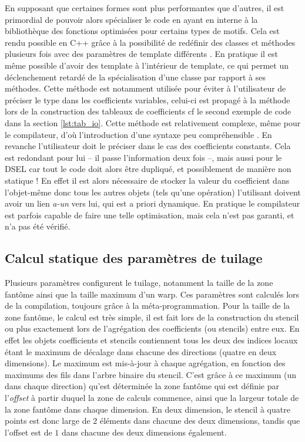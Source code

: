 En supposant que certaines formes sont plus performantes que d'autres, il est primordial de pouvoir alors spécialiser le code en ayant en interne à la bibliothèque des fonctions optimisées pour certains types de motifs. Cela est rendu possible en \textsf{C++} grâce à la possibilité de redéfinir des classes et méthodes plusieurs fois avec des paramètres de template différents \cite{Web1}. En pratique il est même possible d'avoir des template à l'intérieur de template, ce qui permet un déclenchement retardé de la spécialisation d'une classe par rapport à ses méthodes. Cette méthode est notamment utilisée pour éviter à l'utilisateur de préciser le type dans les coefficients variables, celui-ci est propagé à la méthode lors de la construction des tableaux de coefficients cf le second exemple de code dans la section \ref{lst:tab_io}. Cette méthode est relativement complexe, même pour le compilateur, d'où l'introduction d'une syntaxe peu compréhensible \cite{Web2}. En revanche l'utilisateur doit le préciser dans le cas des coefficients constants. Cela est redondant pour lui -- il passe l'information deux fois --, mais aussi pour le DSEL car tout le code doit alors être dupliqué, et possiblement de manière non statique ! En effet il est alors nécessaire de stocker la valeur du coefficient dans l'objet-même donc tous les autres objets (tels qu'une opération) l'utilisant doivent avoir un lien \emph{a-un} vers lui, qui est a priori dynamique. En pratique le compilateur est parfois capable de faire une telle optimisation, mais cela n'est pas garanti, et n'a pas été vérifié.


\subsection{Calcul statique des paramètres de tuilage}
\label{sec:param_tuile}

Plusieurs paramètres configurent le tuilage, notamment la taille de la zone fantôme ainsi que la taille maximum d'un warp. Ces paramètres sont calculés lors de la compilation, toujours grâce à la méta-programmation. Pour la taille de la zone fantôme, le calcul est très simple, il est fait lors de la construction du stencil ou plus exactement lors de l'agrégation des coefficients (ou stencils) entre eux. En effet les objets coefficients et stencils contiennent tous les deux des indices locaux étant le maximum de décalage dans chacune des directions (quatre en deux dimensions). Le maximum est mis-à-jour à chaque agrégation, en fonction des maximums des fils dans l'arbre binaire du stencil. C'est grâce à ce maximum (un dans chaque direction) qu'est déterminée la zone fantôme qui est définie par l'\emph{offset} à partir duquel la zone de calculs commence, ainsi que la largeur totale de la zone fantôme dans chaque dimension. En deux dimension, le stencil à quatre points est donc large de $2$ éléments dans chacune des deux dimensions, tandis que l'offset est de $1$ dans chacune des deux dimensions également.

